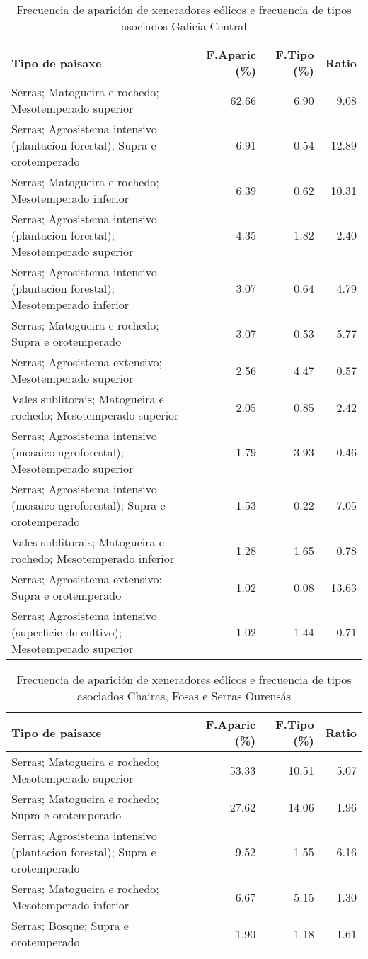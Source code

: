 \begin{table}[p]
\centering
\caption{Frecuencia de aparición de xeneradores eólicos e frecuencia de tipos asociados Galicia Central} 
\label{veolico7}
\begin{tabular}{lrrr}
  \hline
Tipo de paisaxe & F.Aparic (\%) & F.Tipo (\%) & Ratio \\ 
  \hline
Serras; Matogueira e rochedo; Mesotemperado superior & 62.66 & 6.90 & 9.08 \\ 
  Serras; Agrosistema intensivo (plantacion forestal); Supra e orotemperado & 6.91 & 0.54 & 12.89 \\ 
  Serras; Matogueira e rochedo; Mesotemperado inferior & 6.39 & 0.62 & 10.31 \\ 
  Serras; Agrosistema intensivo (plantacion forestal); Mesotemperado superior & 4.35 & 1.82 & 2.40 \\ 
  Serras; Agrosistema intensivo (plantacion forestal); Mesotemperado inferior & 3.07 & 0.64 & 4.79 \\ 
  Serras; Matogueira e rochedo; Supra e orotemperado & 3.07 & 0.53 & 5.77 \\ 
  Serras; Agrosistema extensivo; Mesotemperado superior & 2.56 & 4.47 & 0.57 \\ 
  Vales sublitorais; Matogueira e rochedo; Mesotemperado superior & 2.05 & 0.85 & 2.42 \\ 
  Serras; Agrosistema intensivo (mosaico agroforestal); Mesotemperado superior & 1.79 & 3.93 & 0.46 \\ 
  Serras; Agrosistema intensivo (mosaico agroforestal); Supra e orotemperado & 1.53 & 0.22 & 7.05 \\ 
  Vales sublitorais; Matogueira e rochedo; Mesotemperado inferior & 1.28 & 1.65 & 0.78 \\ 
  Serras; Agrosistema extensivo; Supra e orotemperado & 1.02 & 0.08 & 13.63 \\ 
  Serras; Agrosistema intensivo (superficie de cultivo); Mesotemperado superior & 1.02 & 1.44 & 0.71 \\ 
   \hline
\end{tabular}
\end{table}
\begin{table}[p]
\centering
\caption{Frecuencia de aparición de xeneradores eólicos e frecuencia de tipos asociados Chairas, Fosas e Serras Ourensás} 
\label{veolico8}
\begin{tabular}{lrrr}
  \hline
Tipo de paisaxe & F.Aparic (\%) & F.Tipo (\%) & Ratio \\ 
  \hline
Serras; Matogueira e rochedo; Mesotemperado superior & 53.33 & 10.51 & 5.07 \\ 
  Serras; Matogueira e rochedo; Supra e orotemperado & 27.62 & 14.06 & 1.96 \\ 
  Serras; Agrosistema intensivo (plantacion forestal); Supra e orotemperado & 9.52 & 1.55 & 6.16 \\ 
  Serras; Matogueira e rochedo; Mesotemperado inferior & 6.67 & 5.15 & 1.30 \\ 
  Serras; Bosque; Supra e orotemperado & 1.90 & 1.18 & 1.61 \\ 
   \hline
\end{tabular}
\end{table}
